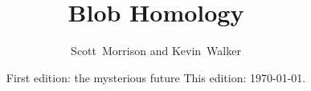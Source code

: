 
\title{Blob Homology}

\author{Scott~Morrison and Kevin~Walker}



\date{
  First edition: the mysterious future
  This edition: \today.
}


